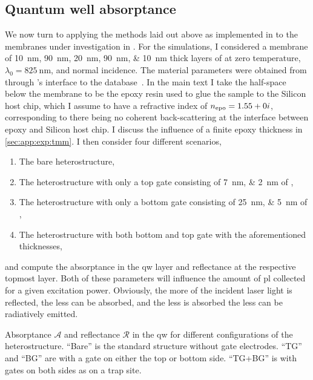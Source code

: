 \subsection{Quantum well absorptance}\label{subsec:exp:tmm:absorptance}
We now turn to applying the methods laid out above as implemented in \pymoosh to the membranes under investigation in \thethesis.
For the simulations, I considered a membrane of \qtylist[list-units = single, list-separator = {/}, list-final-separator = {/}]{10;90;20;90;10}{\nano\meter} thick layers of  at zero temperature, $\lambda_0 = \qty{825}{\nano\meter}$, and normal incidence.
The material parameters were obtained from  through \pymoosh's interface to the  database~\cite{Polyanskiy2024}.
In the main text I take the half-space below the membrane to be the epoxy resin used to glue the sample to the Silicon host chip, which I assume to have a refractive index of $n_{\mathrm{epo}} = 1.55 + 0i$,
corresponding to there being no coherent back-scattering at the interface between epoxy and Silicon host chip.
I discuss the influence of a finite epoxy thickness in \cref{sec:app:exp:tmm}.
I then consider four different scenarios,
\begin{enumerate}
    \item The bare heterostructure,
    \item The heterostructure with only a top gate consisting of \qtylist[list-units = single, list-pair-separator = {/}]{7;2}{\nano\meter} of ,
    \item The heterostructure with only a bottom gate consisting of \qtylist[list-units = single, list-pair-separator = {/}]{25;5}{\nano\meter} of ,
    \item The heterostructure with both bottom and top gate with the aforementioned thicknesses,
\end{enumerate}
and compute the absorptance \absorptance in the \gls{qw} layer and reflectance  at the respective topmost layer.
Both of these parameters will influence the amount of \gls{pl} collected for a given excitation power.
Obviously, the more of the incident laser light is reflected, the less can be absorbed, and the less is absorbed the less can be radiatively emitted.

\begin{margintable}
    \centering
    \footnotesize
    \caption{
        Absorptance $\mathscr{A}$ and reflectance $\mathscr{R}$ in the \gls{qw} for different configurations of the heterostructure.
        \enquote{Bare} is the standard structure without gate electrodes.
        \enquote{TG} and \enquote{BG} are with a gate on either the top or bottom side.
        \enquote{TG+BG} is with gates on both sides as on a trap site.
    }
    \label{tab:exp:tmm:absorptance_reflectance}
    
\end{margintable}


